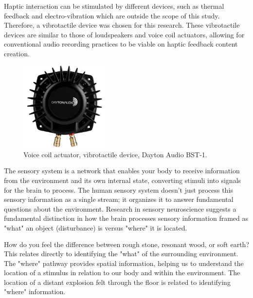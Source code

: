             Haptic interaction can be stimulated by different devices, such as thermal feedback and electro-vibration which are outside the scope of this study. Therefore, a vibrotactile device was chosen for this research. These vibrotactile devices are similar to those of loudspeakers and voice coil actuators\cite{Audio-Tactile_Rendering}, allowing for conventional audio recording practices to be viable on haptic feedback content creation.\par

            \begin{figure}[H]
                \centering
                \includegraphics[width=0.4\textwidth]{images/vibrotactile_bass-shaker.jpg}
                \caption{Voice coil actuator, vibrotactile device, Dayton Audio BST-1.}
                \label{fig:VCA}
            \end{figure}

            The sensory system is a network that enables your body to receive information from the environment and its own internal state, converting stimuli into signals for the brain to process. The human sensory system doesn't just process this sensory information as a single stream; it organizes it to answer fundamental questions about the environment\cite{What_vs_Where_in_Touch}. Research in sensory neuroscience suggests a fundamental distinction in how the brain processes sensory information framed as "what" an object (disturbance) is versus "where" it is located.\par

            How do you feel the difference between rough stone, resonant wood, or soft earth? This relates directly to identifying the "what" of the surrounding environment. The "where" pathway provides spatial information, helping us to understand the location of a stimulus in relation to our body and within the environment. The location of a distant explosion felt through the floor is related to identifying "where" information.\par

